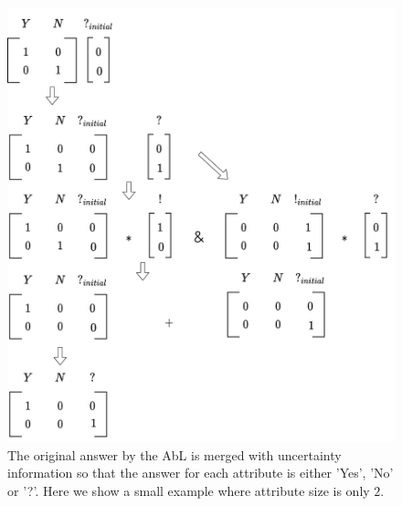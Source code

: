 \documentclass[a4paper,cleardoubleempty,BCOR1cm, 11pt]{report}
\begin{document}
\begin{figure}[t!]
	\centering
	\begin{minipage}{0.45\textwidth}
		\centering
		\includegraphics[width=1\textwidth]{images/extended_vocab.pdf} 
		\caption{The original answer by the AbL is merged with uncertainty information so that the answer for each attribute is either 'Yes', 'No' or '?'. Here we show a small example where attribute size is only $2$.}
		\label{fig:extended_vocab}
	\end{minipage}\hfill
	\begin{minipage}{0.45\textwidth}
		\centering

\end{minipage}
\end{figure}
\end{document}
